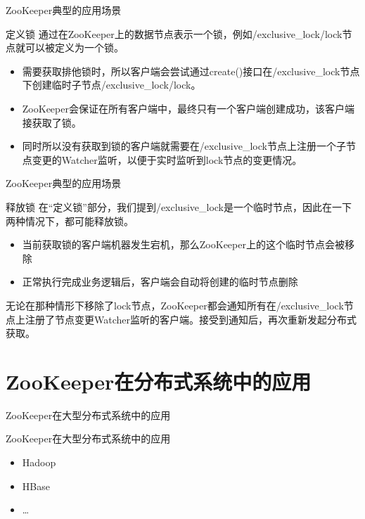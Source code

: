 \documentclass[10pt]{beamer}
\begin{document}
\begin{frame}[fragile]{ZooKeeper典型的应用场景}
  \begin{alertblock}{定义锁}
    通过在ZooKeeper上的数据节点表示一个锁，例如/exclusive\_lock/lock节点就可以被定义为一个锁。
    \begin{itemize}
      \item 需要获取排他锁时，所以客户端会尝试通过create()接口在/exclusive\_lock节点下创建临时子节点/exclusive\_lock/lock。
      \item ZooKeeper会保证在所有客户端中，最终只有一个客户端创建成功，该客户端接获取了锁。
      \item 同时所以没有获取到锁的客户端就需要在/exclusive\_lock节点上注册一个子节点变更的Watcher监听，以便于实时监听到lock节点的变更情况。
    \end{itemize}
  \end{alertblock}
\end{frame}

\begin{frame}[fragile]{ZooKeeper典型的应用场景}
  \begin{alertblock}{释放锁}
    在“定义锁”部分，我们提到/exclusive\_lock是一个临时节点，因此在一下两种情况下，都可能释放锁。
    \begin{itemize}
      \item 当前获取锁的客户端机器发生宕机，那么ZooKeeper上的这个临时节点会被移除
      \item 正常执行完成业务逻辑后，客户端会自动将创建的临时节点删除
    \end{itemize}
    无论在那种情形下移除了lock节点，ZooKeeper都会通知所有在/exclusive\_lock节点上注册了节点变更Watcher监听的客户端。接受到通知后，再次重新发起分布式获取。
  \end{alertblock}
\end{frame}
\section{ZooKeeper在分布式系统中的应用}

\begin{frame}[fragile]{ZooKeeper在大型分布式系统中的应用}
  \begin{alertblock}{ZooKeeper在大型分布式系统中的应用}
    \begin{itemize}
      \item Hadoop
      \item HBase
      \item \ldots
    \end{itemize}
  \end{alertblock}
\end{frame}
\end{document}
